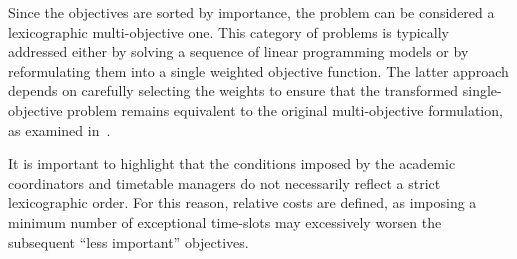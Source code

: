 
    
    Since the objectives are sorted by importance, the problem can be considered a lexicographic multi-objective one. This category of problems is typically addressed either by solving a sequence of linear programming models or by reformulating them into a single weighted objective function. The latter approach depends on carefully selecting the weights to ensure that the transformed single-objective problem remains equivalent to the original multi-objective formulation, as examined in~\cite{cococcioni2018lexicographic}.

    It is important to highlight that the conditions imposed by the academic coordinators and timetable managers do not necessarily reflect a strict lexicographic order. For this reason, relative costs are defined, as imposing a minimum number of exceptional time-slots may excessively worsen the subsequent ``less important'' objectives.




    
